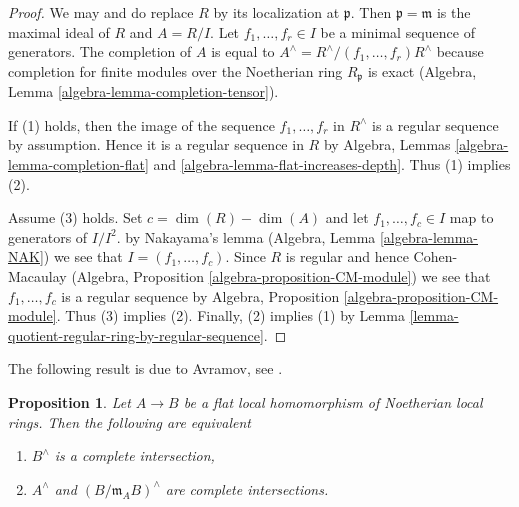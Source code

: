 \documentclass{stacks-project}
\theoremstyle{plain}
\newtheorem{proposition}[subsection]{Proposition}
\theoremstyle{definition}
\theoremstyle{remark}
\numberwithin{equation}{subsection}
\begin{document}
\begin{proof}
We may and do replace $R$ by its localization at $\mathfrak p$.
Then $\mathfrak p = \mathfrak m$ is the maximal ideal of $R$
and $A = R/I$. Let $f_1, \ldots, f_r \in I$ be a minimal sequence
of generators.  The completion of $A$ is equal to
$A^\wedge = R^\wedge/(f_1, \ldots, f_r)R^\wedge$
because completion for finite modules over the Noetherian ring
$R_\mathfrak p$ is exact
(Algebra, Lemma \ref{algebra-lemma-completion-tensor}).

\medskip\noindent
If (1) holds, then the image of the sequence $f_1, \ldots, f_r$ in $R^\wedge$
is a regular sequence by assumption. Hence it is a regular sequence
in $R$ by Algebra, Lemmas \ref{algebra-lemma-completion-flat} and
\ref{algebra-lemma-flat-increases-depth}. Thus (1) implies (2).

\medskip\noindent
Assume (3) holds. Set $c = \dim(R) - \dim(A)$ and let $f_1, \ldots, f_c \in I$
map to generators of $I/I^2$. by Nakayama's lemma
(Algebra, Lemma \ref{algebra-lemma-NAK})
we see that $I = (f_1, \ldots, f_c)$. Since $R$ is regular and hence
Cohen-Macaulay (Algebra, Proposition \ref{algebra-proposition-CM-module})
we see that $f_1, \ldots, f_c$ is a regular sequence by
Algebra, Proposition \ref{algebra-proposition-CM-module}.
Thus (3) implies (2).
Finally, (2) implies (1) by
Lemma \ref{lemma-quotient-regular-ring-by-regular-sequence}.
\end{proof}

\noindent
The following result is due to Avramov, see \cite{Avramov}.

\begin{proposition}
\label{proposition-avramov}
Let $A \to B$ be a flat local homomorphism of Noetherian local rings.
Then the following are equivalent
\begin{enumerate}
\item $B^\wedge$ is a complete intersection,
\item $A^\wedge$ and $(B/\mathfrak m_A B)^\wedge$ are complete intersections.
\end{enumerate}
\end{proposition}
\end{document}

